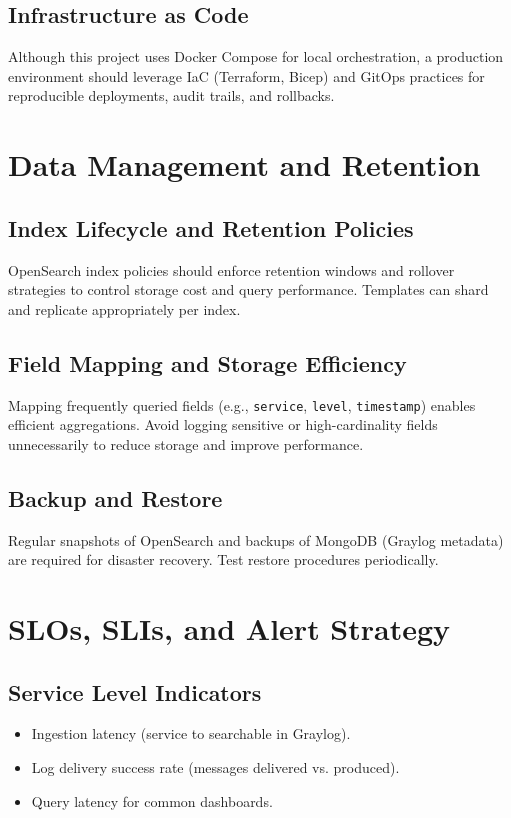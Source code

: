 \documentclass[12pt,a4paper]{report}
\begin{document}
\section{Infrastructure as Code}
Although this project uses Docker Compose for local orchestration, a production environment should leverage IaC (Terraform, Bicep) and GitOps practices for reproducible deployments, audit trails, and rollbacks.

\chapter{Data Management and Retention}
\section{Index Lifecycle and Retention Policies}
OpenSearch index policies should enforce retention windows and rollover strategies to control storage cost and query performance. Templates can shard and replicate appropriately per index.

\section{Field Mapping and Storage Efficiency}
Mapping frequently queried fields (e.g., \texttt{service}, \texttt{level}, \texttt{timestamp}) enables efficient aggregations. Avoid logging sensitive or high-cardinality fields unnecessarily to reduce storage and improve performance.

\section{Backup and Restore}
Regular snapshots of OpenSearch and backups of MongoDB (Graylog metadata) are required for disaster recovery. Test restore procedures periodically.

\chapter{SLOs, SLIs, and Alert Strategy}
\section{Service Level Indicators}
\begin{itemize}[leftmargin=1.2cm]
  \item Ingestion latency (service to searchable in Graylog).
  \item Log delivery success rate (messages delivered vs. produced).
  \item Query latency for common dashboards.
\end{itemize}
\end{document}
